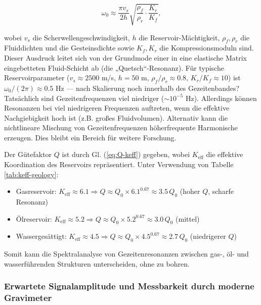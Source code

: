 \documentclass[12pt,a4paper]{article}
\theoremstyle{remark}
\newcommand{\Keff}{K_{\mathrm{eff}}}
\begin{document}
	\begin{equation}
		\omega_0 \approx \frac{\pi v_s}{2h} \sqrt{\frac{\rho_f}{\rho_r} \cdot \frac{K_r}{K_f}},
		\label{eq:resonant-frequency}
	\end{equation}
	
	wobei $v_s$ die Scherwellengeschwindigkeit, $h$ die Reservoir-Mächtigkeit, $\rho_f, \rho_r$ die Fluiddichten und die Gesteinsdichte sowie $K_f, K_r$ die Kompressionsmoduln sind. Dieser Ausdruck leitet sich von der Grundmode einer in eine elastische Matrix eingebetteten Fluid-Schicht ab (die „Quetsch“-Resonanz). Für typische Reservoirparameter ($v_s \approx 2500$ m/s, $h = 50$ m, $\rho_f/\rho_r \approx 0.8$, $K_r/K_f \approx 10$) ist $\omega_0/(2\pi) \approx 0.5$ Hz — nach Skalierung noch innerhalb des Gezeitenbandes? Tatsächlich sind Gezeitenfrequenzen viel niedriger ($\sim 10^{-5}$ Hz). Allerdings können Resonanzen bei viel niedrigeren Frequenzen auftreten, wenn die effektive Nachgiebigkeit hoch ist (z.B. großes Fluidvolumen). Alternativ kann die nichtlineare Mischung von Gezeitenfrequenzen höherfrequente Harmonische erzeugen. Dies bleibt ein Bereich für weitere Forschung.
	
	Der Gütefaktor $Q$ ist durch Gl. (\ref{eq:Q-keff}) gegeben, wobei $\Keff$ die effektive Koordination des Reservoirs repräsentiert. Unter Verwendung von Tabelle \ref{tab:keff-geology}:
	
	\begin{itemize}
		\item Gasreservoir: $\Keff \approx 6.1 \Rightarrow Q \approx Q_0 \times 6.1^{0.67} \approx 3.5\,Q_0$ (hoher $Q$, scharfe Resonanz)
		\item Ölreservoir: $\Keff \approx 5.2 \Rightarrow Q \approx Q_0 \times 5.2^{0.67} \approx 3.0\,Q_0$ (mittel)
		\item Wassergesättigt: $\Keff \approx 4.5 \Rightarrow Q \approx Q_0 \times 4.5^{0.67} \approx 2.7\,Q_0$ (niedrigerer $Q$)
	\end{itemize}
	
	Somit kann die Spektralanalyse von Gezeitenresonanzen zwischen gas-, öl- und wasserführenden Strukturen unterscheiden, ohne zu bohren.
	
	\subsubsection{Erwartete Signalamplitude und Messbarkeit durch moderne Gravimeter}
	\label{subsubsec:signal_amplitude}
	
\end{document}
